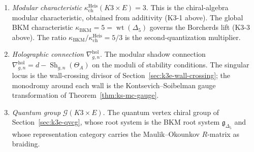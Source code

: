 \begin{construction}
\begin{enumerate}[label=\textup{(\roman*)}]
 \item \emph{Modular characteristic} $\kappa_{\mathrm{ch}}^{\mathrm{Heis}}(K3 \times E) = 3$.
 This is the chiral-algebra modular characteristic, obtained
 from additivity (K3-1 above). The global BKM characteristic
 $\kappa_{\mathrm{BKM}} = 5 = \operatorname{wt}(\Delta_5)$
 governs the Borcherds lift (K3-3 above). The ratio
 $\kappa_{\mathrm{BKM}}/\kappa_{\mathrm{ch}}^{\mathrm{Heis}} = 5/3$ is the
 second-quantization multiplier.

 \item \emph{Holographic connection} $\nabla^{\mathrm{hol}}_{g,n}$.
 The modular shadow connection
 $\nabla^{\mathrm{hol}}_{g,n} = d - \operatorname{Sh}_{g,n}(\Theta_A)$
 on the moduli of stability conditions. The singular locus
 is the wall-crossing divisor of Section~\ref{sec:k3e-wall-crossing};
 the monodromy around each wall is the Kontsevich--Soibelman
 gauge transformation of
 Theorem~\ref{thm:ks-mc-gauge}.

 \item \emph{Quantum group} $\mathcal{G}(K3 \times E)$.
 The quantum vertex chiral group of
 Section~\ref{sec:k3e-qvcg}, whose root system is the
 BKM root system $\mathfrak{g}_{\Delta_5}$ and whose
 representation category carries the Maulik--Okounkov
 $R$-matrix as braiding.
\end{enumerate}
\end{construction}

